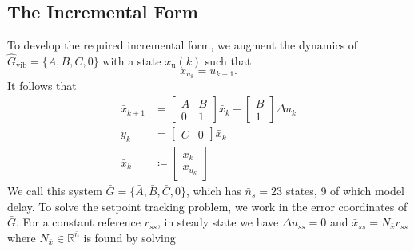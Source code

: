 \documentclass[twocolumn,twoside]{IEEEtran}
\newcommand{\du}{\ensuremath{\Delta u }\xspace}
\newcommand{\Gd}{\ensuremath{\bar G }\xspace}
\newcommand{\Ad}{\ensuremath{\bar A }\xspace}
\newcommand{\Bd}{\ensuremath{\bar B }\xspace}
\newcommand{\Cd}{\ensuremath{\bar C }\xspace}
\newcommand{\xd}{\ensuremath{\bar x }\xspace}
\newcommand{\x}{\ensuremath{x }\xspace}
\newcommand{\xdss}{\ensuremath{\bar x_{ss} }\xspace}
\newcommand{\y}{\ensuremath{y} \xspace}
\newcommand{\hGv}{\ensuremath{\hat{G}_{\text{vib}}}\xspace}
\begin{document}
\subsection{The Incremental Form}\label{sec:incremental}
To develop the required incremental form, we augment the dynamics of \(\hGv=\{A,B,C,0\}\) with a state \(\x_{\text{u}}(k)\) such that
\begin{equation*}
  \x_{u_k} = u_{k-1}.\nonumber
\end{equation*}
It follows that
\begin{subequations}
\begin{align}
  \xd_{k+1}
  &=
    \begin{bmatrix}
      A & B\\ 0 & 1
    \end{bmatrix}
                  \xd_k
    +
    \begin{bmatrix}
      B\\1
    \end{bmatrix}
  \Delta u_k \label{eqn:deltadyn} \\
  \y_k & = \begin{bmatrix}C & 0\end{bmatrix}\xd_k\\
    \xd_k& \coloneqq
    \begin{bmatrix}\x_k\\\x_{u_k} \end{bmatrix}
\end{align}\label{eqn:ssdelta}%
\end{subequations}
We call this system \(\Gd = \{\Ad, \Bd, \Cd, 0\}\), which has \({\bar{n}_s=23}\) states, 9 of which model delay.
To solve the setpoint tracking problem, we work in the error
coordinates of \(\Gd\).
For a constant reference \(r_{ss}\), in steady state we have \({\du_{ss}=0}\) and \({\xdss =N_{\xd}r_{ss}}\) where \({N_{\xd}\in\mathds{R}^{\bar{n}}}\) is found by solving
\end{document}
